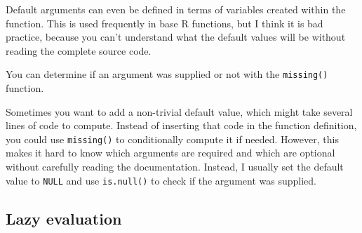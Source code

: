 Default arguments can even be defined in terms of variables created
within the function. This is used frequently in base R functions, but I
think it is bad practice, because you can't understand what the default
values will be without reading the complete source code.

\begin{Shaded}
\begin{Highlighting}[]
\StringTok{ } \NormalTok{, } 
  \StringTok{ }\StringTok{ }\NormalTok{) ^}\StringTok{ }
\NormalTok{\}}
\NormalTok{()}
\NormalTok{(}\NormalTok{)}
\end{Highlighting}
\end{Shaded}

You can determine if an argument was supplied or not with the
\texttt{missing()} function. 

\begin{Shaded}
\begin{Highlighting}[]
\StringTok{ }
  \NormalTok{(}
\NormalTok{\}}
\NormalTok{()}
\NormalTok{(} \NormalTok{)}
\NormalTok{(} \NormalTok{)}
\NormalTok{(}\NormalTok{, }\NormalTok{)}
\end{Highlighting}
\end{Shaded}

Sometimes you want to add a non-trivial default value, which might take
several lines of code to compute. Instead of inserting that code in the
function definition, you could use \texttt{missing()} to conditionally
compute it if needed. However, this makes it hard to know which
arguments are required and which are optional without carefully reading
the documentation. Instead, I usually set the default value to
\texttt{NULL} and use \texttt{is.null()} to check if the argument was
supplied.

\subsection{Lazy evaluation}\label{lazy-evaluation}

